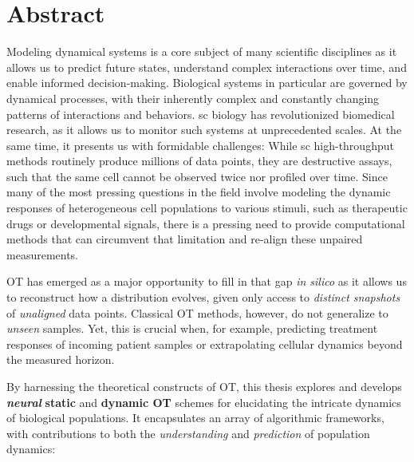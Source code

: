 \begingroup
\let\clearpage\relax
\let\cleardoublepage\relax
\let\cleardoublepage\relax

\chapter*{Abstract}

Modeling dynamical systems is a core subject of many scientific disciplines as it allows us to predict future states, understand complex interactions over time, and enable informed decision-making.
Biological systems in particular are governed by dynamical processes, with their inherently complex and constantly changing patterns of interactions and behaviors.
\Acrlong{sc} biology has revolutionized biomedical research, as it allows us to monitor such systems at unprecedented scales.
At the same time, it presents us with formidable challenges: While \acrlong{sc} high-throughput methods routinely produce millions of data points, they are destructive assays, such that the same cell cannot be observed twice nor profiled over time.
Since many of the most pressing questions in the field involve modeling the dynamic responses of heterogeneous cell populations to various stimuli, such as therapeutic drugs or developmental signals, there is a pressing need to provide computational methods that can circumvent that limitation and re-align these unpaired measurements.

\acrfull{OT} has emerged as a major opportunity to fill in that gap \textit{in silico} as it allows us to reconstruct how a distribution evolves, given only access to \emph{distinct snapshots} of \emph{unaligned} data points.
Classical \acrshort{OT} methods, however, do not generalize to \emph{unseen} samples. Yet, this is crucial when, for example, predicting treatment responses of incoming patient samples or extrapolating cellular dynamics beyond the measured horizon.

By harnessing the theoretical constructs of \acrshort{OT}, this thesis explores and develops \textbf{\emph{neural}} \textbf{static} and \textbf{dynamic \acrlong{OT}} schemes for elucidating the intricate dynamics of biological populations. It encapsulates an array of algorithmic frameworks, with contributions to both the \textit{understanding} and \textit{prediction} of population dynamics:

